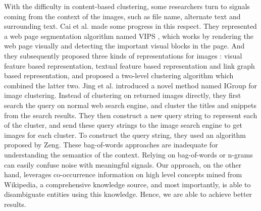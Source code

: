 With the difficulty in content-based clustering,
some researchers turn to signals coming from the context of the images,
such as file name, alternate text and surrounding text.
Cai et al. made some progress in this respect.
They represented a web page segmentation algorithm named VIPS \cite{VIPS},
which works by rendering the web page visually and detecting
the important visual blocks in the page. And they subsequently proposed three
kinds of representations for images \cite{Cai2004}:
visual feature based representation, textual feature based representation and
link graph based representation, and proposed a two-level clustering algorithm
which combined the latter two.
Jing et al. \cite{Jing2006} introduced a novel method named IGroup for image clustering.
Instead of clustering on returned images directly, they first search the query
on normal web search engine, and cluster the titles and snippets from the search results.
They then construct a new query string to represent each of the cluster, and
send these query strings to the image search engine to get images for each
cluster. To construct the query string, they used an algorithm
proposed by Zeng\cite{Zeng2004}.
These bag-of-words approaches are inadequate for understanding the semantics of
the context. Relying on bag-of-words or n-grams can easily confuse noise with meaningful
signals. Our approach, on the other hand, leverages co-occurrence information on
high level concepts mined from Wikipedia, a
comprehensive knowledge source, and most importantly,
is able to disambiguate entities using
this knowledge. Hence, we are able to achieve better results.

